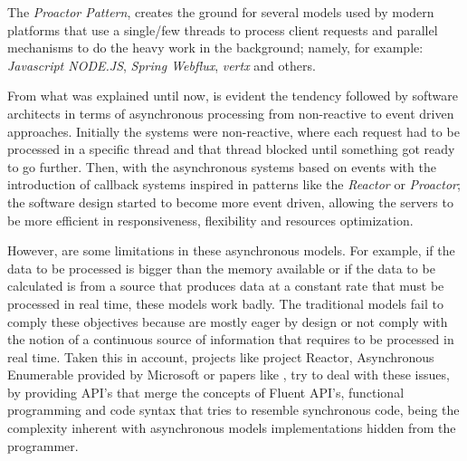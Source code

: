 The \textit{Proactor Pattern}, creates the ground for several models used by modern platforms that use a single/few threads to process client requests and parallel mechanisms to do the heavy work in the background; namely, for example: \textit{Javascript NODE.JS}, \textit{Spring Webflux}, \textit{vertx} and others.

From what was explained until now, is evident the tendency followed by software architects in terms of asynchronous processing from non-reactive to event driven approaches. Initially the systems were non-reactive, where each request had to be processed in a 
specific thread and that thread blocked until something got ready to go further. 
Then, with the asynchronous systems based on events with the introduction of callback systems inspired in patterns like the \textit{Reactor} or \textit{Proactor}; the software design started to become more event driven, allowing the servers to be more efficient in responsiveness, flexibility and resources optimization. 

However, are some limitations in these asynchronous models. For example, if the data to be processed is bigger than the memory available or if the data to be calculated is from a source that produces data at a constant rate that must be processed in real time, these models work badly.  
The traditional models fail to comply these objectives because are mostly eager by design or not comply with the notion of a continuous source of information that requires to be processed in real time.
Taken this in account, projects like project Reactor, Asynchronous Enumerable provided by Microsoft or papers like \cite{LAZYVSEAGER}, try to deal with these issues, by providing API's that merge the concepts of Fluent API's, functional programming and code syntax that tries to resemble synchronous code, being the complexity inherent with asynchronous models implementations hidden from the programmer. 

\clearpage




